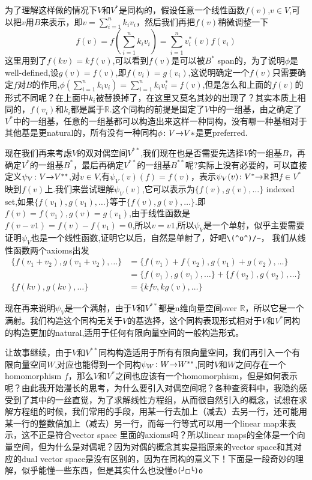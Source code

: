 \documentclass[UTF8,11pt,a4paper]{ctexart}%
\begin{document}
为了理解这样做的情况下$V$和$V^{*}$是同构的，假设任意一个线性函数$f(v)$,$v \in V$,可以把$v$用$B$来表示，即$v=\sum\limits_{i=1}^{n}{k_iv_i}$，然后我们再把$f(v)$稍微调整一下\[f(v)=f\left(\sum\limits_{i=1}^{n}{k_iv_i}\right)=\sum\limits_{i=1}^{n}{v_i^{*}(v)f(v_i)}\]这里用到了$f(kv)=kf(v)$,可以看到$f(v)$是可以被$B^*$ span的，为了说明$\phi$是well-defined,设$g(v)=f(v)$,即$f(v_i)=g(v_i)$,这说明确定一个$f(v)$只需要确定$f$对$B$的作用,$\phi(\sum\limits_{i=1}^{n}{k_iv_i})=\sum\limits_{i=1}^{n}{k_iv_i^{*}}=f(v)$,但是怎么和上面的$f(v)$的形式不同呢？在上面中$k_i$被替换掉了，在这里又莫名其妙的出现了？其实本质上相同的，$f(v_i)$和$k_i$都是属于$\mathbb{R}$.这个同构的前提是固定了$V$中的一组基，由之确定了$V^{*}$中的一组基，任意的一组基都可以构造出来这样一种同构，没有哪一种基相对于其他基是更natural的，所有没有一种同构${\phi}\colon{V}{\to}{V*}$是更preferred.

现在我们再来考虑$V$的双对偶空间$V^{**}$,我们现在也是否需要先选择$V$的一组基$B$，再确定$V^{*}$的一组基$B^{*}$，最后再确定$V^{**}$的一组基$B^{**}$呢?实际上没有必要的，可以直接定义${\psi_{V}}\colon{V}{\to}{V^{**}}$,对$v \in V$,有$\psi_{V}(v)(f)=f(v)$，表示${\psi_{V}(v)}\colon{V^*}{\to}{\mathbb{R}}$把$f \in V^{*}$映到$f(v)$上.我们来尝试理解$\psi_{V}(v)$,它可以表示为$\{f(v),g(v),\ldots\}$ indexed set,如果$\{f(v_1),g(v_1),\ldots\}$等于$\{f(v),g(v),\ldots\}$.即$f(v)=f(v_1),g(v)=g(v_1)$,由于线性函数是$f(v-v1)=f(v)-f(v_1)=0$,所以$v=v1$,所以$\psi_{V}$是一个单射，似乎主要需要证明$\psi_{V}$也是一个线性函数,证明它以后，自然是单射了，好吧\verb|\(^o^)/~|， 我们从线性函数两个axioms出发
	\begin{align*}
		\{f(v_1+v_2),g(v_1+v_2),\ldots\}& =\{f(v_1)+f(v_2),g(v_1)+g(v_2),\ldots\} \\ 
		&=\{f(v_1),g(v_1),\ldots\}+\{f(v_2),g(v_2),\ldots\}\\
		\{f(kv),g(kv),\ldots\} &= \{kf{v},kg(v),\ldots\}	
	\end{align*}

现在再来说明$\psi_{V}$是一个满射，由于$V$和$V^{**}$都是n维向量空间over $\mathbb{R}$，所以它是一个满射。我们构造这个同构无关于$V$的基选择，这个同构表现形式相对于$V$和$V^{*}$同构的构造更加的natural,适用于任何有限向量空间的一般构造形式。


让故事继续，由于$V$和$V^{**}$同构构造适用于所有有限向量空间，我们再引入一个有限向量空间$W$,对应也能得到一个同构${\psi_{W}}\colon{W}{\to}{W^{**}}$,同时$V$和$W$之间存在一个homomorphism $f$，那么$V$和$V^{*}$之间也应该有一个homomorphism，但是如何表示呢？由此我开始漫长的思考，为什么要引入对偶空间呢？各种查资料中，我隐约感受到了其中的一丝直觉，为了求解线性方程组，从而很自然引入的概念，试想在求解方程组的时候，我们常用的手段，用某一行去加上（减去）去另一行，还可能用某一行的整数倍加上（减去）另一行，而每一行等式可以用一个linear map来表示，这不正是符合vector space 里面的axioms吗？所以linear maps的全体是一个向量空间，但为什么是对偶呢？因为对偶的概念其实是指原来的vector space和其对应的dual vector space是没有区别的，因为在同构的意义下！下面是一段奇妙的理解，似乎能懂一些东西，但是其实什么也没懂\verb|o(╯□╰)o|
\end{document}
